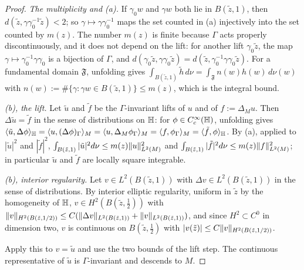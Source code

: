 \begin{proof}
\emph{The multiplicity and (a).} If $\gamma_0w$ and $\gamma w$ both lie in $B(\tilde z,1)$, then $d(\tilde z,\gamma\gamma_0^{-1}\tilde z)<2$; so
$\gamma\mapsto\gamma\gamma_0^{-1}$ maps the set counted in (a) injectively into the set counted by $m(z)$. The number $m(z)$ is finite
because $\Gamma$ acts properly discontinuously, and it does not depend on the lift: for another lift $\gamma_0\tilde z$, the map
$\gamma\mapsto\gamma_0^{-1}\gamma\gamma_0$ is a bijection of $\Gamma$, and $d(\gamma_0\tilde z,\gamma\gamma_0\tilde z)=d(\tilde z,\gamma_0^{-1}\gamma\gamma_0\tilde z)$.
For a fundamental domain $\mathfrak F$, unfolding gives $\int_{B(\tilde z,1)}\tilde h\,d\nu=\int_{\mathfrak F}n(w)h(w)\,d\nu(w)$ with
$n(w):=\#\{\gamma:\gamma w\in B(\tilde z,1)\}\le m(z)$, which is the integral bound.

\emph{(b), the lift.} Let $\tilde u$ and $\tilde f$ be the $\Gamma$-invariant lifts of $u$ and of $f:=\Delta_Mu$. Then $\Delta\tilde u=\tilde f$ in the
sense of distributions on $\mathbb{H}$: for $\phi\in C_c^\infty(\mathbb{H})$, unfolding gives
$\langle\tilde u,\Delta\phi\rangle_{\mathbb{H}}=\langle u,(\Delta\phi)_\Gamma\rangle_M=\langle u,\Delta_M\phi_\Gamma\rangle_M=\langle f,\phi_\Gamma\rangle_M=\langle\tilde f,\phi\rangle_{\mathbb{H}}$.
By (a), applied to $|\tilde u|^2$ and $|\tilde f|^2$, $\int_{B(\tilde z,1)}|\tilde u|^2d\nu\le m(z)\lVert u\rVert^2_{L^2(M)}$ and
$\int_{B(\tilde z,1)}|\tilde f|^2d\nu\le m(z)\lVert f\rVert^2_{L^2(M)}$; in particular $\tilde u$ and $\tilde f$ are locally square integrable.

\emph{(b), interior regularity.} Let $v\in L^2(B(\tilde z,1))$ with $\Delta v\in L^2(B(\tilde z,1))$ in the sense of distributions. By interior
elliptic regularity, uniform in $\tilde z$ by the homogeneity of $\mathbb{H}$, $v\in H^2(B(\tilde z,\tfrac12))$ with
$\lVert v\rVert_{H^2(B(\tilde z,1/2))}\le C(\lVert \Delta v\rVert_{L^2(B(\tilde z,1))}+\lVert v\rVert_{L^2(B(\tilde z,1))})$, and since $H^2\subset C^0$ in dimension two, $v$ is
continuous on $B(\tilde z,\tfrac12)$ with $|v(\tilde z)|\le C\lVert v\rVert_{H^2(B(\tilde z,1/2))}$.

Apply this to $v=\tilde u$ and use the two bounds of the lift step. The continuous representative of $\tilde u$ is $\Gamma$-invariant
and descends to $M$. \qedhere
\end{proof}

